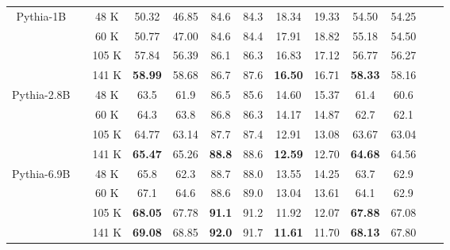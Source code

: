 \documentclass{article}
\begin{document}
\begin{table}[t]
{\begin{tabular}{ccccccccccccc}
    \multirow{4}{*}{Pythia-1B}
    & & 48 K  & 50.32 & 46.85  & 84.6 & 84.3    & 18.34 & 19.33     & 54.50 & 54.25 &    \\
    & & 60 K  & 50.77 & 47.00  & 84.6 & 84.4    & 17.91 & 18.82     & 55.18   & 54.50 &    \\
    & & 105 K & 57.84 & 56.39  & 86.1 & 86.3    & 16.83 & 17.12     & 56.77 & 56.27 & \\
    & & 141 K & \textbf{58.99} & 58.68  & 86.7 & 87.6    & \textbf{16.50} & 16.71     & \textbf{58.33} & 58.16 & \\
    \midrule
    \multirow{4}{*}{Pythia-2.8B}
    & & 48 K  & 63.5 & 61.9     & 86.5 & 85.6   & 14.60  & 15.37    & 61.4 & 60.6 & \\
    & & 60 K  & 64.3 & 63.8     & 86.8 & 86.3   & 14.17  & 14.87    & 62.7 & 62.1 & \\
    & & 105 K & 64.77 & 63.14   & 87.7 & 87.4   & 12.91 & 13.08     & 63.67 & 63.04 & \\
    & & 141 K & \textbf{65.47} & 65.26   & \textbf{88.8} & 88.6   & \textbf{12.59} & 12.70     & \textbf{64.68} & 64.56 & \\
    \midrule
    \multirow{4}{*}{Pythia-6.9B} 
    & & 48 K  & 65.8 & 62.3     & 88.7 & 88.0       & 13.55 & 14.25     & 63.7  & 62.9 & \\
    & & 60 K  & 67.1 & 64.6     & 88.6 &  89.0      & 13.04 & 13.61     & 64.1 & 62.9 & \\
    & & 105 K & \textbf{68.05} & 67.78   & \textbf{91.1} & 91.2       & 11.92 & 12.07           & \textbf{67.88} & 67.08 & \\
    & & 141 K & \textbf{69.08} & 68.85   & \textbf{92.0} & 91.7       & \textbf{11.61} & 11.70  & \textbf{68.13} & 67.80 & \\

\end{tabular}}
\end{table}
\end{document}
